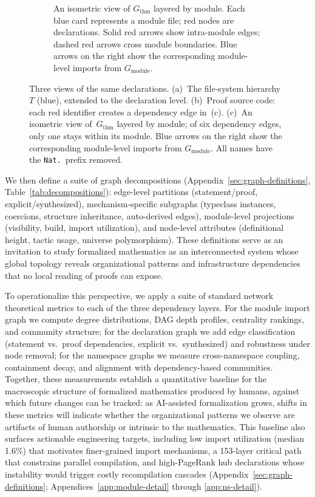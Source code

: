 \begin{figure}[ht]
\begin{subfigure}[b]{\textwidth}
\begin{tikzpicture}
\end{tikzpicture}
\caption{An isometric view of $G_{\mathrm{thm}}$ layered by module. Each \textcolor{blue!60!black}{blue card} represents a module file; \textcolor{red!70!black}{red nodes} are declarations. Solid \textcolor{red!70!black}{red arrows} show intra-module edges; dashed \textcolor{red!70!black}{red arrows} cross module boundaries. \textcolor{blue!60!black}{Blue arrows} on the right show the corresponding module-level imports from $G_{\mathrm{module}}$.}
\label{fig:dep-view-main}
\end{subfigure}
\caption{Three views of the same declarations. (a)~The file-system hierarchy~$T$ (\textcolor{blue!60!black}{blue}), extended to the declaration level. (b)~Proof source code: each \textcolor{red!70!black}{red identifier} creates a dependency edge in~(c). (c)~An isometric view of~$G_{\mathrm{thm}}$ layered by module; of six dependency edges, only one stays within its module. \textcolor{blue!60!black}{Blue arrows} on the right show the corresponding module-level imports from $G_{\mathrm{module}}$. All names have the \texttt{Nat.}\ prefix removed.}
\label{fig:three-views-main}
\end{figure}
We then define a suite of graph decompositions (Appendix~\ref{sec:graph-definitions}, Table~\ref{tab:decompositions}): edge-level partitions (statement/proof, explicit/synthesized), mechanism-specific subgraphs (typeclass instances, coercions, structure inheritance, auto-derived edges), module-level projections (visibility, build, import utilization), and node-level attributes (definitional height, tactic usage, universe polymorphism). These definitions serve as an invitation to study formalized mathematics as an interconnected system whose global topology reveals organizational patterns and infrastructure dependencies that no local reading of proofs can expose.

To operationalize this perspective, we apply a suite of standard network theoretical metrics to each of the three dependency layers. For the module import graph we compute degree distributions, DAG depth profiles, centrality rankings, and community structure; for the declaration graph we add edge classification (statement vs.\ proof dependencies, explicit vs.\ synthesized) and robustness under node removal; for the namespace graphs we measure cross-namespace coupling, containment decay, and alignment with dependency-based communities. Together, these measurements establish a quantitative baseline for the macroscopic structure of formalized mathematics produced by humans, against which future changes can be tracked: as AI-assisted formalization grows, shifts in these metrics will indicate whether the organizational patterns we observe are artifacts of human authorship or intrinsic to the mathematics. This baseline also surfaces actionable engineering targets, including low import utilization (median 1.6\%) that motivates finer-grained import mechanisms, a 153-layer critical path that constrains parallel compilation, and high-PageRank hub declarations whose instability would trigger costly recompilation cascades (Appendix~\ref{sec:graph-definitions}; Appendices~\ref{app:module-detail} through \ref{app:ns-detail}).

